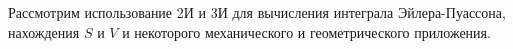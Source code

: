 \documentclass[../../main.tex]{subfiles}
\begin{document}
	Рассмотрим использование 2И и 3И для вычисления интеграла Эйлера-Пуассона, нахождения $S$ и $V$ и некоторого механического и геометрического приложения.
\end{document}

